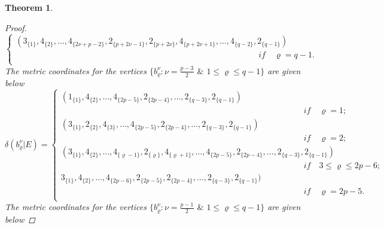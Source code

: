 \documentclass[]{interact}
\theoremstyle{plain}%
\newtheorem{theorem}{Theorem}[section]
\theoremstyle{definition}
\theoremstyle{remark}
\begin{document}
\begin{theorem}
\begin{proof}
\begin{equation*}
\begin{cases}
                     (3_{\{1\}},4_{\{2\}}, \ldots,4_{\{2\nu+p-2\}},2_{\{p+2\nu-1\}},2_{\{p+2\nu\}},4_{\{p+2\nu+1\}},\ldots, 4_{\{q-2\}}, 2_{\{q-1\}})\\
                     \qquad  \qquad \qquad \qquad \qquad \qquad \qquad \qquad \qquad \qquad  \qquad \qquad\qquad\qquad\quad\textit{if}\quad  \varrho = q-1.\\
                     \end{cases}
                    \end{equation*}
                    \noindent The metric coordinates for the vertices 
                     $\{b^\nu_\varrho: \nu =\frac{p-3}{2} $ $\&$  $1\leq \varrho\leq q-1 \}$ are given below
                        \begin{equation*}
                        \delta(b^{\nu}_{\varrho}|E)=
                   \begin{cases}
                   (1_{\{1\}},4_{\{2\}}, \ldots, 4_{\{2p-5 \}},2_{\{2p-4 \}}, \ldots,2_{\{q-3\}},2_{\{q-1\}})\\
\qquad  \qquad \qquad \qquad \qquad \qquad \qquad \qquad \qquad \qquad  \qquad \qquad\qquad\qquad\quad\textit{if}\quad \varrho= 1;\\
                   (3_{\{1\}},2_{\{ 2\}},4_{\{3\}}, \ldots, 4_{\{2p-5 \}},2_{\{2p-4 \}}, \ldots,2_{\{q-3\}},2_{\{q-1\}})\\
\qquad  \qquad \qquad \qquad \qquad \qquad \qquad \qquad \qquad \qquad  \qquad \qquad\qquad\qquad\quad\textit{if}\quad    \varrho =2  ;\\
                   (3_{\{1\}},4_{\{2\}}, \ldots,4_{\{\varrho-1\}},2_{\{ \varrho\}},4_{\{\varrho +1\}}, \ldots, 4_{\{2p-5 \}},2_{\{2p-4 \}}, \ldots,2_{\{q-3\}},2_{\{q-1\}})\\
\qquad  \qquad \qquad \qquad \qquad \qquad \qquad \qquad \qquad \qquad  \qquad \qquad\qquad\qquad\quad\textit{if}\quad  3 \leq  \varrho  \leq 2p-6  ;\\
                   3_{\{1\}},4_{\{2\}}, \ldots,4_{\{2p-6\}},2_{\{ 2p-5\}},2_{\{2p-4 \}}, \ldots,2_{\{q-3\}},2_{\{q-1\}})\\
\qquad  \qquad \qquad \qquad \qquad \qquad \qquad \qquad \qquad \qquad  \qquad \qquad\qquad\qquad\quad\textit{if}\quad  \varrho = 2p-5.\\
                    \end{cases}
                    \end{equation*}
\noindent The metric coordinates for the vertices 
                     $\{b^\nu_\varrho: \nu =\frac{p-1}{2} $ $\&$  $1\leq \varrho\leq q-1 \}$ are given below

\end{proof}
\end{theorem}
\end{document}
